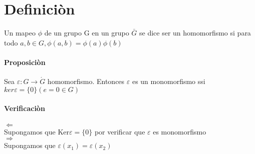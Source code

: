 \newpage
\section{Definici\`{o}n}
Un mapeo $\phi$ de un grupo G en un grupo  $\bar{G} $ se dice ser un homomorfismo si para todo $a,b\in G,\phi (a,b)=\phi (a)\phi (b)$ 
  \paragraph{Proposici\`{o}n}
  Sea $\varepsilon :G\rightarrow \acute{G}  $ homomorfismo. Entonces $\varepsilon $ es un monomorfismo ssi $ker\varepsilon =\{0\} (e=0\in G)$
  \paragraph{Verificaci\`{o}n} 
  $\Leftarrow $ \\
  Supongamos que Ker$\varepsilon =\{0\}$ por verificar que $\varepsilon$ es monomorfismo \\ $\Rightarrow$   \\ Supongamos que $\varepsilon(x_{1})=\varepsilon (x_{2})$ 
    \\ 
